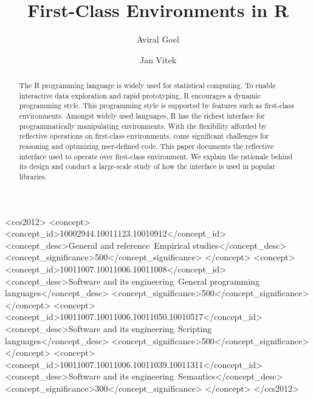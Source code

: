 \documentclass[sigplan,screen]{acmart}
\begin{document}
\title{First-Class Environments in R}
\author{Aviral Goel}
\author{Jan Vitek}

\begin{abstract}
  The R programming language is widely used for statistical computing. To enable
  interactive data exploration and rapid prototyping, R encourages a dynamic
  programming style. This programming style is supported by features such as
  first-class environments. Amongst widely used languages, R has the richest
  interface for programmatically manipulating environments. With the flexibility
  afforded by reflective operations on first-class environments, come
  significant challenges for reasoning and optimizing user-defined code. This
  paper documents the reflective interface used to operate over first-class
  environment. We explain the rationale behind its design and conduct a
  large-scale study of how the interface is used in popular libraries.
\end{abstract}

\begin{CCSXML}
<ccs2012>
<concept>
<concept_id>10002944.10011123.10010912</concept_id>
<concept_desc>General and reference~Empirical studies</concept_desc>
<concept_significance>500</concept_significance>
</concept>
<concept>
<concept_id>10011007.10011006.10011008</concept_id>
<concept_desc>Software and its engineering~General programming languages</concept_desc>
<concept_significance>500</concept_significance>
</concept>
<concept>
<concept_id>10011007.10011006.10011050.10010517</concept_id>
<concept_desc>Software and its engineering~Scripting languages</concept_desc>
<concept_significance>500</concept_significance>
</concept>
<concept>
<concept_id>10011007.10011006.10011039.10011311</concept_id>
<concept_desc>Software and its engineering~Semantics</concept_desc>
<concept_significance>300</concept_significance>
</concept>
</ccs2012>
\end{CCSXML}


\end{document}
